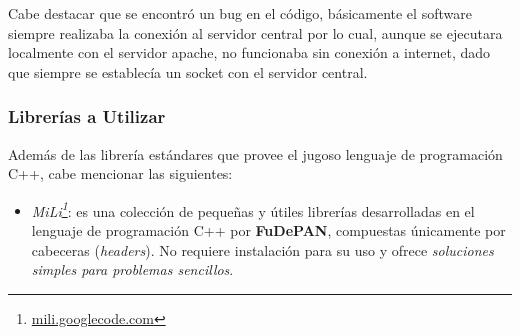 \par Cabe destacar que se encontró un bug en el código, básicamente el software siempre realizaba la conexión al servidor central por lo cual, aunque se ejecutara localmente con el servidor apache, no funcionaba sin conexión a internet, dado que siempre se establecía un socket con el servidor central.

\subsubsection{Librerías a Utilizar}
Además de las librería estándares que provee el jugoso lenguaje de programación C++, cabe mencionar las siguientes:
\begin{itemize}
	\item \emph{MiLi\footnote{\url{mili.googlecode.com}}}: es una colección de pequeñas y útiles librerías desarrolladas en el 
	lenguaje de programación C++ por \textbf{FuDePAN}, compuestas únicamente por cabeceras (\emph{headers}). No requiere
	instalación para su uso y ofrece \emph{soluciones simples para problemas sencillos}.
		 

\end{itemize}
